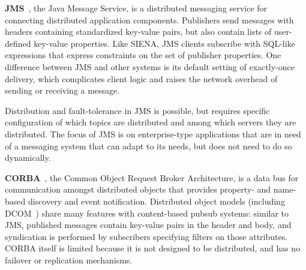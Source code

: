 \textbf{JMS}~\cite{hapner2002java}, the Java Message Service, is a distributed messaging service for connecting distributed application components.
Publishers send messages with headers containing standardized key-value pairs, but also contain lists of user-defined key-value properties.
Like SIENA, JMS clients subscribe with SQL-like expressions that express constraints on the set of publisher properties.
One difference between JMS and other systems is its default setting of exactly-once delivery, which complicates client logic and raises the network overhead of sending or receiving a message.

Distribution and fault-tolerance in JMS is possible, but requires specific configuration of which topics are distributed and among which servers they are distributed.
The focus of JMS is on enterprise-type applications that are in need of a messaging system that can adapt to its needs, but does not need to do so dynamically.




\textbf{CORBA}~\cite{vinoski1997corba}, the Common Object Request Broker Architecture, is a data bus for communication amongst distributed objects that provides property- and name-based discovery and event notification.
Distributed object models (including DCOM~\cite{horstmann1997dcom}) share many features with content-based pubsub systems: similar to JMS, published messages contain key-value pairs in the header and body, and syndication is performed by subscribers specifying filters on those attributes.
CORBA itself is limited because it is not designed to be distributed, and has no failover or replication mechanisms.

